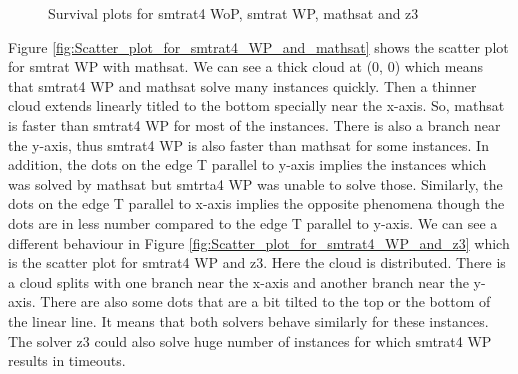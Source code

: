 \begin{figure}[!ht]
\caption{Survival plots for smtrat4 WoP, smtrat WP, mathsat and z3} 
\label{fig:Survival_plots_smtrat4} 
\end{figure}

\noindent Figure \ref{fig:Scatter_plot_for_smtrat4_WP_and_mathsat} shows the scatter plot for smtrat WP with mathsat.
We can see a thick cloud at (0, 0) which means that smtrat4 WP and mathsat solve many instances quickly.
Then a thinner cloud extends linearly titled to the bottom specially near the x-axis.
So, mathsat is faster than smtrat4 WP for most of the instances.
There is also a branch near the y-axis, thus smtrat4 WP is also faster than mathsat for some instances.
In addition, the dots on the edge T parallel to y-axis implies the instances which was solved by mathsat but smtrta4 WP was unable to solve those.
Similarly, the dots on the edge T parallel to x-axis implies the opposite phenomena though the dots are in less number compared to the edge T parallel to y-axis.
We can see a different behaviour in Figure \ref{fig:Scatter_plot_for_smtrat4_WP_and_z3} which is the scatter plot for smtrat4 WP and z3.
Here the cloud is distributed.
There is a cloud splits with one branch near the x-axis and another branch near the y-axis.
There are also some dots that are a bit tilted to the top or the bottom of the linear line.
It means that both solvers behave similarly for these instances.
The solver z3 could also solve huge number of instances for which smtrat4 WP results in timeouts.
\newline

